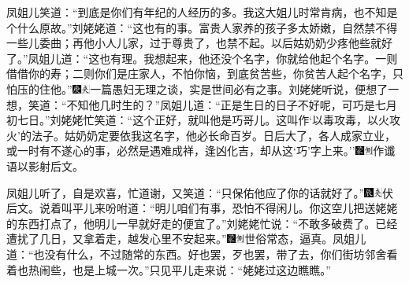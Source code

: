 凤姐儿笑道：``到底是你们有年纪的人经历的多。我这大姐儿时常肯病，也不知是个什么原故。''刘姥姥道：``这也有的事。富贵人家养的孩子多太娇嫩，自然禁不得一些儿委曲；再他小人儿家，过于尊贵了，也禁不起。以后姑奶奶少疼他些就好了。''凤姐儿道：``这也有理。我想起来，他还没个名字，你就给他起个名字。一则借借你的寿；二则你们是庄家人，不怕你恼，到底贫苦些，你贫苦人起个名字，只怕压的住他。''{\includegraphics[width=3mm]{../Images/00004}\includegraphics[width=3mm]{../Images/00012}\footnotesize \kaishu 一篇愚妇无理之谈，实是世间必有之事。}刘姥姥听说，便想了一想，笑道：``不知他几时生的？''凤姐儿道：``正是生日的日子不好呢，可巧是七月初七日。''刘姥姥忙笑道：``这个正好，就叫他是巧哥儿。这叫作`以毒攻毒，以火攻火'的法子。姑奶奶定要依我这名字，他必长命百岁。日后大了，各人成家立业，或一时有不遂心的事，必然是遇难成祥，逢凶化吉，却从这`巧'字上来。''{\includegraphics[width=3mm]{../Images/00006}\includegraphics[width=3mm]{../Images/00011}\footnotesize \kaishu 作谶语以影射后文。}

凤姐儿听了，自是欢喜，忙道谢，又笑道：``只保佑他应了你的话就好了。''{\includegraphics[width=3mm]{../Images/00009}\includegraphics[width=3mm]{../Images/00012}\footnotesize \kaishu 伏后文。}说着叫平儿来吩咐道：``明儿咱们有事，恐怕不得闲儿。你这空儿把送姥姥的东西打点了，他明儿一早就好走的便宜了。''刘姥姥忙说：``不敢多破费了。已经遭扰了几日，又拿着走，越发心里不安起来。''{\includegraphics[width=3mm]{../Images/00006}\includegraphics[width=3mm]{../Images/00011}\footnotesize \kaishu 世俗常态，逼真。}凤姐儿道：``也没有什么，不过随常的东西。好也罢，歹也罢，带了去，你们街坊邻舍看着也热闹些，也是上城一次。''只见平儿走来说：``姥姥过这边瞧瞧。''

